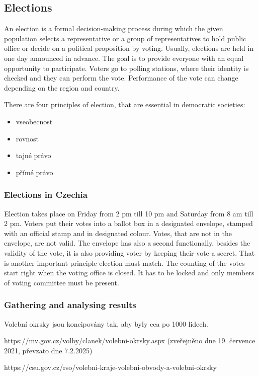 \subsection{Elections} 

An election is a formal decision-making process during which the given population selects a representative or a group of representatives to hold public office or decide on a political proposition by voting. 
Usually, elections are held in one day announced in advance. The goal is to provide everyone with an equal opportunity to participate. Voters go to polling stations, where their identity is checked and they can perform the vote. Performance of the vote can change depending on the region and country. \cite{election} 


There are four principles of election, that are essential in democratic societies: 

\begin{itemize}
    \item vseobecnost 
    \item rovnost
    \item tajné právo 
    \item přímé právo 
\end{itemize}

\subsubsection*{Elections in Czechia}

Election takes place on Friday from 2 pm till 10 pm and Saturday from 8 am till 2 pm. Voters put their votes into a ballot box in a designated envelope, stamped with an official stamp and in designated colour. Votes, that are not in the envelope, are not valid. The envelope has also a second functionally, besides the validity of the vote, it is also providing voter by keeping their vote a secret. That is another important principle election must match. The counting of the votes start right when the voting office is closed. It has to be locked and only members of voting committee must be present. \cite{volby}


\subsubsection*{Gathering and analysing results}

\begin{koment}
Volební okrsky jsou koncipovány tak, aby byly cca po 1000 lidech. 

https://mv.gov.cz/volby/clanek/volebni-okrsky.aspx (zveřejněno dne 19. července 2021, převzato dne 7.2.2025) 

https://csu.gov.cz/rso/volebni-kraje-volebni-obvody-a-volebni-okrsky 
\end{koment}


